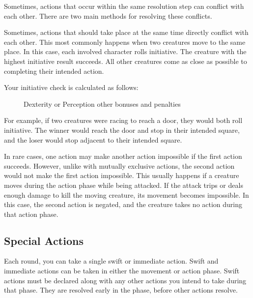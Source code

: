             Sometimes, actions that occur within the same resolution step can conflict with each other.
            There are two main methods for resolving these conflicts.

             Sometimes, actions that should take place at the same time directly conflict with each other.
            This most commonly happens when two creatures move to the same place.
            In this case, each involved character rolls initiative.
            The creature with the highest initiative result succeeds.
            All other creatures come as close as possible to completing their intended action.

            Your initiative check is calculated as follows:

            \begin{figure}[h]
                \centering Dexterity or Perception \add other bonuses and penalties
            \end{figure}

            For example, if two creatures were racing to reach a door, they would both roll initiative.
            The winner would reach the door and stop in their intended square, and the loser would stop adjacent to their intended square.

             In rare cases, one action may make another action impossible if the first action succeeds.
            However, unlike with mutually exclusive actions, the second action would not make the first action impossible.
            This usually happens if a creature moves during the action phase while being attacked.
            If the attack trips or deals enough damage to kill the moving creature, its movement becomes impossible.
            In this case, the second action is negated, and the creature takes no action during that action phase.

    \subsection{Special Actions}

        \label{Swift and Immediate Actions} Each round, you can take a single swift or immediate action.
        Swift and immediate actions can be taken in either the movement or action phase.
        Swift actions must be declared along with any other actions you intend to take during that phase.
        They are resolved early in the phase, before other actions resolve.

